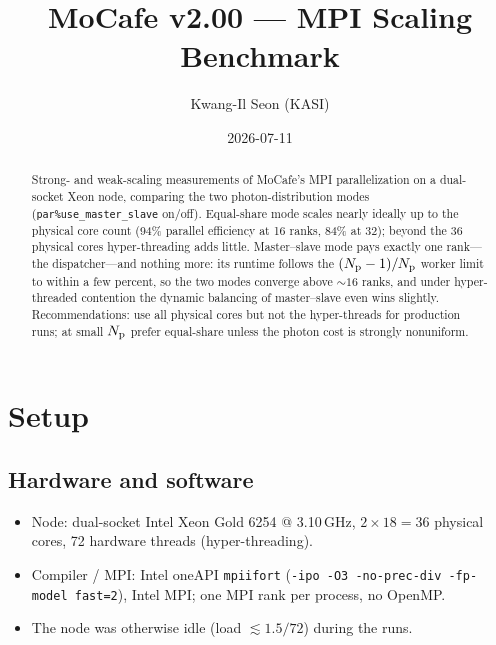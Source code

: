 \documentclass[english,a4paper]{kiseon_memo}
\newcommand{\code}[1]{\texttt{#1}}
\newcommand{\pp}[1]{\texttt{par\%#1}}
\newcommand{\Np}{N_{\rm p}}
\begin{document}
\title{MoCafe v2.00 --- MPI Scaling Benchmark}
\author{Kwang-Il Seon (KASI)}
\date{2026-07-11}
\maketitle

\begin{abstract}
\noindent
Strong- and weak-scaling measurements of MoCafe's MPI parallelization on a
dual-socket Xeon node, comparing the two photon-distribution modes
(\pp{use\_master\_slave} on/off).  Equal-share mode scales nearly ideally up to
the physical core count (94\% parallel efficiency at 16 ranks, 84\% at 32);
beyond the 36 physical cores hyper-threading adds little.  Master--slave mode
pays exactly one rank---the dispatcher---and nothing more: its runtime follows
the $(\Np-1)/\Np$ worker limit to within a few percent, so the two modes
converge above ${\sim}16$ ranks, and under hyper-threaded contention the
dynamic balancing of master--slave even wins slightly.  Recommendations: use
all physical cores but not the hyper-threads for production runs; at small
$\Np$ prefer equal-share unless the photon cost is strongly nonuniform.
\end{abstract}

\tableofcontents
\clearpage

\section{Setup}

\subsection{Hardware and software}
\begin{itemize}
\item Node: dual-socket Intel Xeon Gold 6254 @ 3.10\,GHz,
      $2\times18 = 36$ physical cores, 72 hardware threads (hyper-threading).
\item Compiler / MPI: Intel oneAPI \code{mpiifort} (\code{-ipo -O3 -no-prec-div
      -fp-model fast=2}), Intel MPI; one MPI rank per process, no OpenMP.
\item The node was otherwise idle (load ${\lesssim}1.5/72$) during the runs.
\end{itemize}
\end{document}
